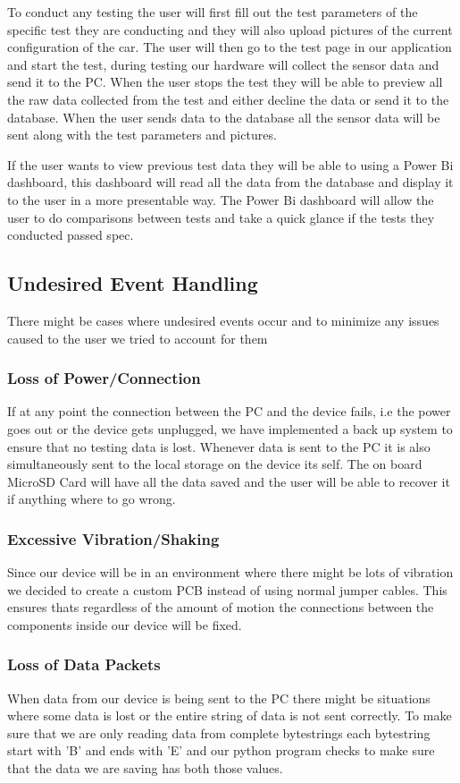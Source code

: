 \documentclass[12pt, titlepage]{article}
\begin{document}
To conduct any testing the user will first fill out the test parameters of the specific test they are conducting and they will also upload pictures of the current configuration of the car. The user will then go to the test page in our application and start the test, during testing our hardware will collect the sensor data and send it to the PC. When the user stops the test they will be able to preview all the raw data collected from the test and either decline the data or send it to the database. When the user sends data to the database all the sensor data will be sent along with the test parameters and pictures.

If the user wants to view previous test data they will be able to using a Power Bi dashboard, this dashboard will read all the data from the database and display it to the user in a more presentable way. The Power Bi dashboard will allow the user to do comparisons between tests and take a quick glance if the tests they conducted passed spec.

\subsection{Undesired Event Handling}
There might be cases where undesired events occur and to minimize any issues caused to the user we tried to account for them
\subsubsection{Loss of Power/Connection}
If at any point the connection between the PC and the device fails, i.e the power goes out or the device gets unplugged, we have implemented a back up system to ensure that no testing data is lost. Whenever data is sent to the PC it is also simultaneously sent to the local storage on the device its self. The on board MicroSD Card will have all the data saved and the user will be able to recover it if anything where to go wrong.

\subsubsection{Excessive Vibration/Shaking}
Since our device will be in an environment where there might be lots of vibration we decided to create a custom PCB instead of using normal jumper cables. This ensures thats regardless of the amount of motion the connections between the components inside our device will be fixed.

\subsubsection{Loss of Data Packets}
When data from our device is being sent to the PC there might be situations where some data is lost or the entire string of data is not sent correctly. To make sure that we are only reading data from complete bytestrings each bytestring start with 'B' and ends with 'E' and our python program checks to make sure that the data we are saving has both those values.
\end{document}
